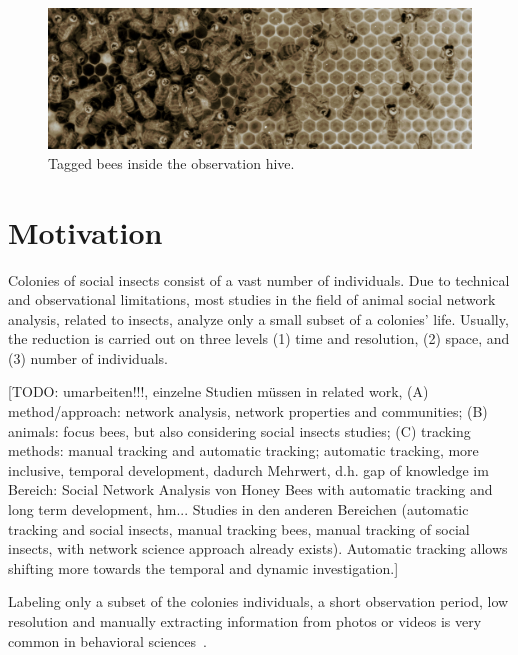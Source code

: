 \begin{figure}[htb]
	\centering
	\includegraphics[width=1.0\textwidth]{Figures/markers}
	\caption{Tagged bees inside the observation hive.}
	\label{fig:markers}
\end{figure}

\section{Motivation}

Colonies of social insects consist of a vast number of individuals. Due to technical and observational limitations, most studies in the field of animal social network analysis, related to insects, analyze only a small subset of a colonies' life.
Usually, the reduction is carried out on three levels (1) time and resolution, (2) space, and (3) number of individuals.


[TODO: umarbeiten!!!, einzelne Studien müssen in related work, (A) method/approach: network analysis, network properties and communities; (B) animals: focus bees, but also considering social insects studies; (C) tracking methods: manual tracking and automatic tracking; automatic tracking, more inclusive, temporal development, dadurch Mehrwert, d.h. gap of knowledge im Bereich: Social Network Analysis von Honey Bees with automatic tracking and long term development, hm... Studies in den anderen Bereichen (automatic tracking and social insects, manual tracking bees, manual tracking of social insects, with network science approach already exists). Automatic tracking allows shifting more towards the temporal and dynamic investigation.]

Labeling only a subset of the colonies individuals, a short observation period, low res\-olution and manually extracting information from photos or videos is very common in behavioral sciences~\cite{naug2008structure, quevillon2015social}.

